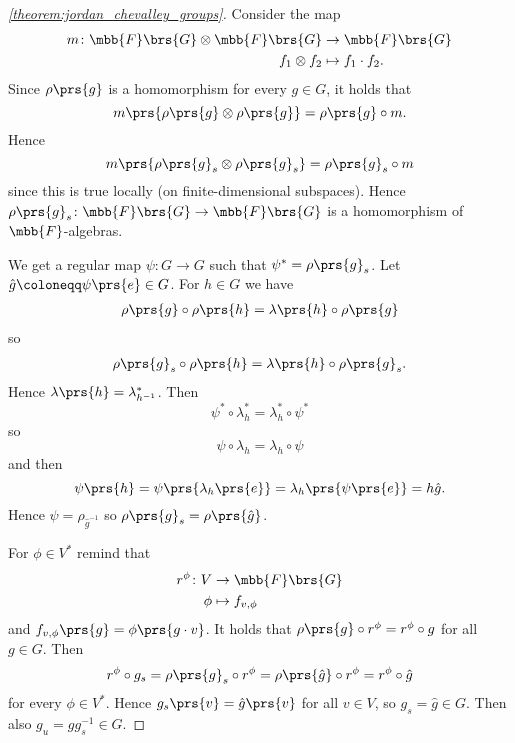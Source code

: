 \documentclass[10pt,a4paper,twoside,openany,hidelinks]{book}
\begin{document}
\begin{proof}[\ref{theorem:jordan_chevalley_groups}]
Consider the map
\begin{align*}
m \colon \mbb{F}\brs{G} \otimes \mbb{F}\brs{G} &\to \mbb{F}\brs{G} \\
f_1 \otimes f_2 &\mapsto f_1 \cdot f_2 \text{.}
\end{align*}
Since $\rho\prs{g}$ is a homomorphism for every $g \in G$, it holds that
\[m\prs{\rho\prs{g} \otimes \rho\prs{g}} = \rho\prs{g} \circ m \text{.}\]
Hence
\[m\prs{\rho\prs{g}_s \otimes \rho\prs{g}_s} = \rho\prs{g}_s \circ m\]
since this is true locally (on finite-dimensional subspaces).
Hence $\rho\prs{g}_s \colon \mbb{F}\brs{G} \to \mbb{F}\brs{G}$ is a homomorphism of $\mbb{F}$-algebras.

We get a regular map
$\psi \colon G \to G$ such that $\psi^* = \rho\prs{g}_s$.
Let $\hat{g} \coloneqq \psi\prs{e} \in G$.
For $h \in G$ we have
\begin{align*}
\rho\prs{g} \circ \rho\prs{h} = \lambda\prs{h} \circ \rho\prs{g}
\end{align*}
so
\begin{align*}
\rho\prs{g}_s \circ \rho\prs{h} = \lambda\prs{h} \circ \rho\prs{g}_s \text{.}
\end{align*}
Hence $\lambda\prs{h} = \lambda_{h^{-1}}^*$.
Then
\[\psi^* \circ \lambda_h^* = \lambda_h^* \circ \psi^*\]
so
\[\psi \circ \lambda_h = \lambda_h \circ \psi\]
and then
\[\psi\prs{h} = \psi\prs{\lambda_h\prs{e}} = \lambda_h\prs{\psi\prs{e}} = h \hat{g} \text{.}\]
Hence $\psi = \rho_{\hat{g}^{-1}}$ so $\rho\prs{g}_s = \rho\prs{\hat{g}}$.

For $\phi \in V^*$ remind that
\begin{align*}
r^\phi \colon V &\to \mbb{F}\brs{G} \\
\phi &\mapsto f_{v,\phi}
\end{align*}
and $f_{v,\phi}\prs{g} = \phi\prs{g\cdot v}$.
It holds that $\rho\prs{g} \circ r^\phi = r^\phi \circ g$ for all $g \in G$.
Then
\begin{align*}
r^\phi \circ g_s = \rho\prs{g}_s \circ r^\phi = \rho\prs{\hat{g}} \circ r^\phi = r^\phi \circ \hat{g}
\end{align*}
for every $\phi \in V^*$. Hence $g_s\prs{v} = \hat{g}\prs{v}$ for all $v \in V$, so $g_s = \hat{g} \in G$.
Then also $g_u = g g_s^{-1} \in G$.
\end{proof}
\end{document}
